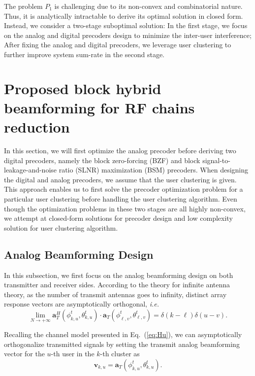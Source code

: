 \documentclass[conference]{IEEEtran}
\begin{document}
{The problem $P_1$ is challenging due to its non-convex and combinatorial nature. Thus, it is analytically intractable to derive its optimal solution in closed form. Instead, we consider a two-stage suboptimal solution: In the first stage, we focus on the analog  and digital precoders design to minimize the inter-user interference; After fixing the analog and digital precoders, we leverage user clustering to further improve system sum-rate in the second stage.

\section{Proposed block hybrid beamforming for RF chains reduction}
In this section, we will first optimize the analog precoder before deriving two digital precoders, namely the block zero-forcing (BZF) and block signal-to-leakage-and-noise ratio (SLNR) maximization (BSM) precoders. When designing the digital and analog precoders, we assume that the user clustering is given. This approach enables us to first solve the precoder optimization problem for a particular user clustering before handling the user clustering algorithm. Even though the optimization problems in these two stages are all highly non-convex, we attempt at closed-form solutions for precoder design and low complexity solution for user clustering algorithm.

\subsection{Analog Beamforming Design}\label{analog}
In this subsection, we first focus on the analog beamforming design on both transmitter and receiver sides. According to the theory for infinite antenna theory, as the number of transmit antennas goes to infinity, distinct array response vectors are asymptotically orthogonal, {\em i.e.}
\begin{equation}\label{Eq:assumption}
\lim_{N\rightarrow +\infty} \bm{a}_{T}^{H}(\phi^t_{k,u},\theta^t_{k,u}) \cdot\bm{a}_{T}(\phi^t_{\ell,v},\theta^t_{\ell,v})=\delta(k-\ell)\delta(u-v).
\end{equation}

Recalling the channel model presented in Eq.~(\ref{eq:Hu}), we can asymptotically orthogonalize transmitted signals by setting the transmit analog beamforming vector for the $u$-th user in the $k$-th cluster as
\begin{equation}
\bm{v}_{k,u}=\bm{a}_{T}(\phi^t_{k,u},\theta^t_{k,u}).
\label{eq:vku}
\end{equation}

}
\end{document}
